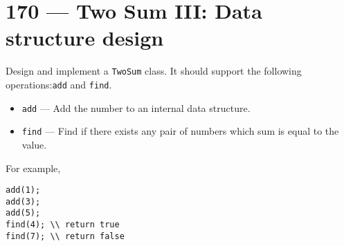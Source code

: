 \section{170 --- Two Sum III: Data structure design}
Design and implement a \texttt{TwoSum} class. It should support the following operations:\texttt{add} and \texttt{find}.
\begin{itemize}
\item \texttt{add} --- Add the number to an internal data structure.
\item \texttt{find} --- Find if there exists any pair of numbers which sum is equal to the value.
\end{itemize}
For example,
\begin{lstlisting}[style=customc]
add(1);
add(3);
add(5);
find(4); \\ return true
find(7); \\ return false
\end{lstlisting}
